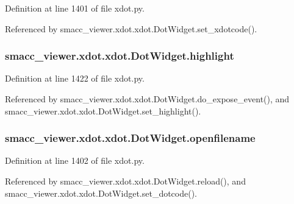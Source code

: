 Definition at line 1401 of file xdot.\+py.



Referenced by smacc\+\_\+viewer.\+xdot.\+xdot.\+Dot\+Widget.\+set\+\_\+xdotcode().

\subsubsection[{\texorpdfstring{highlight}{highlight}}]{\setlength{\rightskip}{0pt plus 5cm}smacc\+\_\+viewer.\+xdot.\+xdot.\+Dot\+Widget.\+highlight}\hypertarget{classsmacc__viewer_1_1xdot_1_1xdot_1_1DotWidget_af5a63433d396e1bfa5dc325a79267220}{}\label{classsmacc__viewer_1_1xdot_1_1xdot_1_1DotWidget_af5a63433d396e1bfa5dc325a79267220}


Definition at line 1422 of file xdot.\+py.



Referenced by smacc\+\_\+viewer.\+xdot.\+xdot.\+Dot\+Widget.\+do\+\_\+expose\+\_\+event(), and smacc\+\_\+viewer.\+xdot.\+xdot.\+Dot\+Widget.\+set\+\_\+highlight().

\subsubsection[{\texorpdfstring{openfilename}{openfilename}}]{\setlength{\rightskip}{0pt plus 5cm}smacc\+\_\+viewer.\+xdot.\+xdot.\+Dot\+Widget.\+openfilename}\hypertarget{classsmacc__viewer_1_1xdot_1_1xdot_1_1DotWidget_a4698d9416255a0026e38a545f6c0ec5f}{}\label{classsmacc__viewer_1_1xdot_1_1xdot_1_1DotWidget_a4698d9416255a0026e38a545f6c0ec5f}


Definition at line 1402 of file xdot.\+py.



Referenced by smacc\+\_\+viewer.\+xdot.\+xdot.\+Dot\+Widget.\+reload(), and smacc\+\_\+viewer.\+xdot.\+xdot.\+Dot\+Widget.\+set\+\_\+dotcode().

